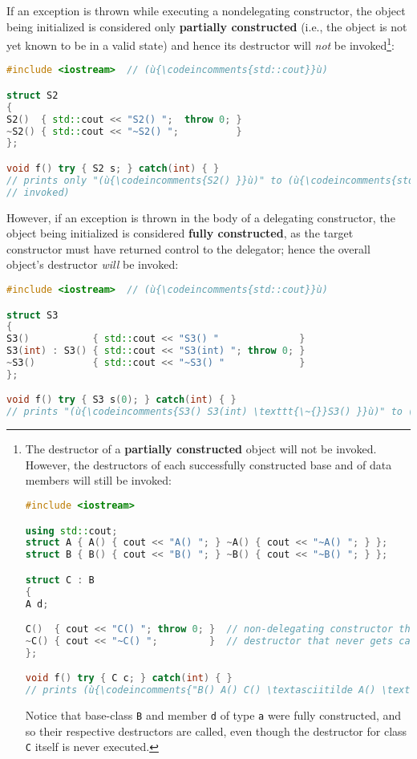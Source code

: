 \noindent If an exception is thrown while executing a nondelegating constructor,
the object being initialized is considered only \textbf{partially
constructed} (i.e., the object is not yet known to be in a valid state)
and hence its destructor will \emph{not} be
invoked{\cprotect\footnote{The destructor of a \textbf{partially
constructed} object will not be invoked. However, the destructors of
each successfully constructed base and of data members will still be
invoked:

\begin{lstlisting}[language=C++, basicstyle={\ttfamily\footnotesize}]
#include <iostream>

using std::cout;
struct A { A() { cout << "A() "; } ~A() { cout << "~A() "; } };
struct B { B() { cout << "B() "; } ~B() { cout << "~B() "; } };

struct C : B
{
A d;

C()  { cout << "C() "; throw 0; }  // non-delegating constructor that throws
~C() { cout << "~C() ";         }  // destructor that never gets called
};

void f() try { C c; } catch(int) { }
// prints (ù{\codeincomments{"B() A() C() \textasciitilde A() \textasciitilde B()"}}ù) to (ù{\codeincomments{stdout}}ù)
\end{lstlisting}

\noindent Notice that base-class \texttt{B} and member \texttt{d} of type
\texttt{a} were fully constructed, and so their respective destructors
are called, even though the destructor for class \texttt{C} itself is
never executed.}}:

\begin{lstlisting}[language=C++]
#include <iostream>  // (ù{\codeincomments{std::cout}}ù)

struct S2
{
S2()  { std::cout << "S2() ";  throw 0; }
~S2() { std::cout << "~S2() ";          }
};

void f() try { S2 s; } catch(int) { }
// prints only "(ù{\codeincomments{S2() }}ù)" to (ù{\codeincomments{stdout}}ù) (i.e., the destructor of (ù{\codeincomments{S2}}ù) is never
// invoked)
\end{lstlisting}

\noindent However, if an exception is thrown in the body of a delegating
constructor, the object being initialized is considered \textbf{fully
constructed}, as the target constructor must have returned control to
the delegator; hence the overall object's destructor \emph{will} be
invoked:

\begin{lstlisting}[language=C++]
#include <iostream>  // (ù{\codeincomments{std::cout}}ù)

struct S3
{
S3()           { std::cout << "S3() "              }
S3(int) : S3() { std::cout << "S3(int) "; throw 0; }
~S3()          { std::cout << "~S3() "             }
};

void f() try { S3 s(0); } catch(int) { }
// prints "(ù{\codeincomments{S3() S3(int) \texttt{\~{}}S3() }}ù)" to (ù{\codeincomments{stdout}}ù)
\end{lstlisting}


